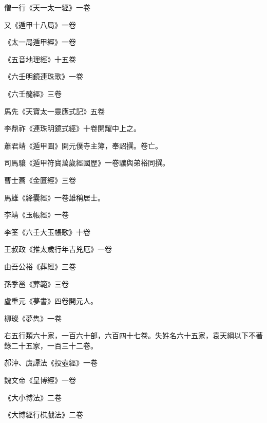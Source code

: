 \begin{pinyinscope}
 僧一行《天一太一經》一卷



 又《遁甲十八局》一卷



 《太一局遁甲經》一卷



 《五音地理經》十五卷



 《六壬明鏡連珠歌》一卷



 《六壬髓經》三卷



 馬先《天寶太一靈應式記》五卷



 李鼎祚《連珠明鏡式經》十卷開耀中上之。



 蕭君靖《遁甲圖》開元僕寺主簿，奉詔撰。卷亡。



 司馬驤《遁甲符寶萬歲經國歷》一卷驤與弟裕同撰。



 曹士蔿《金匱經》三卷



 馬雄《絳囊經》一卷雄稱居士。



 李靖《玉帳經》一卷



 李筌《六壬大玉帳歌》十卷



 王叔政《推太歲行年吉兇厄》一卷



 由吾公裕《葬經》三卷



 孫季邕《葬範》三卷



 盧重元《夢書》四卷開元人。



 柳璨《夢雋》一卷



 右五行類六十家，一百六十部，六百四十七卷。失姓名六十五家，袁天綱以下不著錄二十五家，一百三十二卷。



 郝沖、虞譚法《投壺經》一卷



 魏文帝《皇博經》一卷



 《大小博法》二卷



 《大博經行棋戲法》二卷




\end{pinyinscope}
